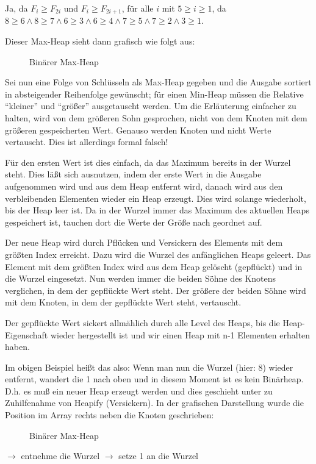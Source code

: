 Ja, da $F_{i}\geq F_{2i}$ und $F_{i}\geq F_{2i+1}$, für alle $i$ mit $5\geq i \geq 1$, da $8\geq 6 \wedge 8\geq 7 \wedge6\geq 3 \wedge 
6\geq 4 \wedge 7\geq 5 \wedge 7\geq 2 \wedge 3\geq 1$.

Dieser Max-Heap sieht dann grafisch wie folgt aus:

\begin{figure}[H]
	\centering
	\caption{Binärer Max-Heap}
	\label{101103c}
\end{figure}
\vspace{3mm}

Sei nun eine Folge von Schlüsseln als Max-Heap gegeben und die Ausgabe sortiert in absteigender Reihenfolge gewünscht; für einen
Min-Heap müssen die Relative "`kleiner"' und "`größer"' ausgetauscht werden. Um die Erläuterung einfacher zu halten, wird von dem
größeren Sohn gesprochen, nicht von dem Knoten mit dem größeren gespeicherten Wert. Genauso werden Knoten und nicht Werte vertauscht.
Dies ist allerdings formal falsch!

Für den ersten Wert ist dies einfach, da das Maximum bereits in der Wurzel steht.
Dies läßt sich ausnutzen, indem der erste Wert in die Ausgabe aufgenommen wird und aus dem Heap entfernt wird, danach wird aus den
verbleibenden Elementen wieder ein Heap erzeugt. Dies wird solange wiederholt, bis der Heap leer ist. Da in der Wurzel immer das Maximum
des aktuellen Heaps gespeichert ist, tauchen dort die Werte der Größe nach geordnet auf.

Der neue Heap wird durch Pflücken und Versickern des Elements mit dem größten Index erreicht. Dazu wird die Wurzel des anfänglichen Heaps geleert. Das Element mit dem größten Index wird aus dem Heap gelöscht
(gepflückt) und in die Wurzel eingesetzt.
Nun werden immer die beiden Söhne des Knotens verglichen, in dem der gepflückte Wert steht. Der größere der beiden Söhne wird mit
dem Knoten, in dem der gepflückte Wert steht, vertauscht.

Der gepflückte Wert sickert allmählich durch alle Level des Heaps, bis die
Heap-Eigenschaft wieder hergestellt ist und wir einen Heap mit n-1 Elementen erhalten haben.

Im obigen Beispiel heißt das also:
Wenn man nun die Wurzel (hier: 8) wieder entfernt, wandert die 1 nach oben und in diesem Moment ist es kein Binärheap. D.h. es muß
ein neuer Heap erzeugt werden und dies geschieht unter zu Zuhilfenahme von Heapify (Versickern).
In der grafischen Darstellung wurde die Position im Array rechts neben die Knoten geschrieben:
\begin{figure}[H]
	\centering \hspace{2cm}
	\caption{Binärer Max-Heap}
	\label{101103de}
\end{figure}
\vspace{3mm}
\noindent
$\rightarrow$ entnehme die Wurzel \hspace{5cm}
$\rightarrow$ setze 1 an die Wurzel

